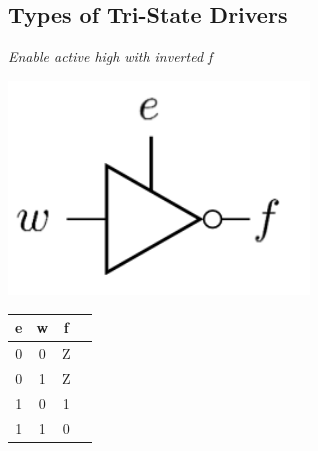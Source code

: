 \documentclass[12pt,openany]{book}
\begin{document}
\subsection{Types of Tri-State Drivers}


	\begin{minipage}{0.3\textwidth}
	\begin{center}
		\textit{Enable active high} \newline \textit{with inverted f}
	\end{center}
		\centering
	\includegraphics[width=0.6\textwidth]{circuits/11.2.1.png} %
	
		\begin{tabular}{|c|c|c|c|}
			\hline
			e & w & f \\
			\hline
			0 & 0 & Z  \\
			0 & 1 & Z  \\
			1 & 0 & 1  \\
			1 & 1 & 0  \\
			\hline
		\end{tabular}
		\hfill
	\end{minipage}
\end{document}
